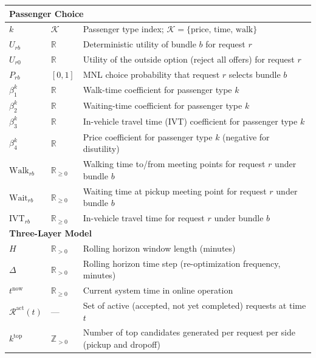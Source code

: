 \begin{longtable}{@{}lll@{}}
\multicolumn{3}{l}{\textbf{Passenger Choice}} \\
\midrule
$k$ & $\mathcal{K}$ & Passenger type index; $\mathcal{K} = \{\text{price},\, \text{time},\, \text{walk}\}$ \\
$U_{rb}$ & $\mathbb{R}$ & Deterministic utility of bundle $b$ for request $r$ \\
$U_{r0}$ & $\mathbb{R}$ & Utility of the outside option (reject all offers) for request $r$ \\
$P_{rb}$ & $[0,1]$ & MNL choice probability that request $r$ selects bundle $b$ \\
$\beta_1^k$ & $\mathbb{R}$ & Walk-time coefficient for passenger type $k$ \\
$\beta_2^k$ & $\mathbb{R}$ & Waiting-time coefficient for passenger type $k$ \\
$\beta_3^k$ & $\mathbb{R}$ & In-vehicle travel time (IVT) coefficient for passenger type $k$ \\
$\beta_4^k$ & $\mathbb{R}$ & Price coefficient for passenger type $k$ (negative for disutility) \\
$\text{Walk}_{rb}$ & $\mathbb{R}_{\geq 0}$ & Walking time to/from meeting points for request $r$ under bundle $b$ \\
$\text{Wait}_{rb}$ & $\mathbb{R}_{\geq 0}$ & Waiting time at pickup meeting point for request $r$ under bundle $b$ \\
$\text{IVT}_{rb}$ & $\mathbb{R}_{\geq 0}$ & In-vehicle travel time for request $r$ under bundle $b$ \\
\midrule

\multicolumn{3}{l}{\textbf{Three-Layer Model}} \\
\midrule
$H$ & $\mathbb{R}_{>0}$ & Rolling horizon window length (minutes) \\
$\Delta$ & $\mathbb{R}_{>0}$ & Rolling horizon time step (re-optimization frequency, minutes) \\
$t^{\text{now}}$ & $\mathbb{R}_{\geq 0}$ & Current system time in online operation \\
$\mathcal{R}^{\text{act}}(t)$ & --- & Set of active (accepted, not yet completed) requests at time $t$ \\
$k^{\text{top}}$ & $\mathbb{Z}_{>0}$ & Number of top candidates generated per request per side (pickup and dropoff) \\

\end{longtable}
